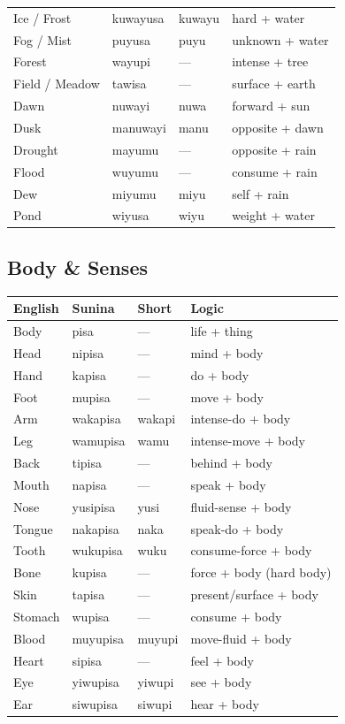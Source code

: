 \documentclass[12pt, a4paper]{article}
\begin{document}
\begin{tabular}{@{}llll@{}}
Ice / Frost & kuwayusa & kuwayu & hard + water \\
Fog / Mist & puyusa & puyu & unknown + water \\
Forest & wayupi & --- & intense + tree \\
Field / Meadow & tawisa & --- & surface + earth \\
Dawn & nuwayi & nuwa & forward + sun \\
Dusk & manuwayi & manu & opposite + dawn \\
Drought & mayumu & --- & opposite + rain \\
Flood & wuyumu & --- & consume + rain \\
Dew & miyumu & miyu & self + rain \\
Pond & wiyusa & wiyu & weight + water \\
\bottomrule
\end{tabular}

\subsection{Body \& Senses}
\begin{tabular}{@{}llll@{}}
\toprule
\textbf{English} & \textbf{Sunina} & \textbf{Short} & \textbf{Logic} \\ \midrule
Body & pisa & --- & life + thing \\
Head & nipisa & --- & mind + body \\
Hand & kapisa & --- & do + body \\
Foot & mupisa & --- & move + body \\
Arm & wakapisa & wakapi & intense-do + body \\
Leg & wamupisa & wamu & intense-move + body \\
Back & tipisa & --- & behind + body \\
Mouth & napisa & --- & speak + body \\
Nose & yusipisa & yusi & fluid-sense + body \\
Tongue & nakapisa & naka & speak-do + body \\
Tooth & wukupisa & wuku & consume-force + body \\
Bone & kupisa & --- & force + body (hard body) \\
Skin & tapisa & --- & present/surface + body \\
Stomach & wupisa & --- & consume + body \\
Blood & muyupisa & muyupi & move-fluid + body \\
Heart & sipisa & --- & feel + body \\
Eye & yiwupisa & yiwupi & see + body \\
Ear & siwupisa & siwupi & hear + body \\
\bottomrule
\end{tabular}
\end{document}
